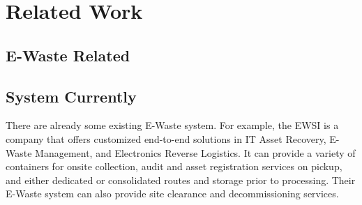 \section{Related Work}

\subsection{E-Waste Related}

% 

% 

%

%

%

%

%

\subsection{System Currently}
There are already some existing E-Waste system. For example, the EWSI is a company that offers customized end-to-end solutions in IT Asset Recovery, E-Waste Management, and Electronics Reverse Logistics. It can provide a variety of containers for onsite collection, audit and asset registration services on pickup, and either dedicated or consolidated routes and storage prior to processing. Their E-Waste system can also provide site clearance and decommissioning services.

